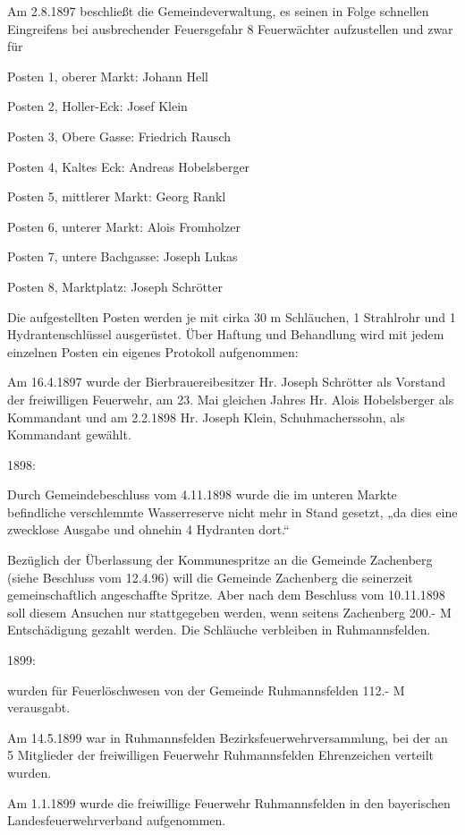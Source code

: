 Am 2.8.1897 beschließt die Gemeindeverwaltung, es seinen in Folge schnellen
Eingreifens bei ausbrechender Feuersgefahr 8 Feuerwächter aufzustellen und zwar
für



Posten 1, oberer Markt: Johann Hell

Posten 2, Holler-Eck: Josef Klein

Posten 3, Obere Gasse: Friedrich Rausch

Posten 4, Kaltes Eck: Andreas Hobelsberger

Posten 5, mittlerer Markt: Georg Rankl

Posten 6, unterer Markt: Alois Fromholzer

Posten 7, untere Bachgasse: Joseph Lukas

Posten 8, Marktplatz: Joseph Schrötter



Die aufgestellten Posten werden je mit cirka 30 m Schläuchen, 1 Strahlrohr und 1
Hydrantenschlüssel ausgerüstet. Über Haftung und Behandlung wird mit jedem
einzelnen Posten ein eigenes Protokoll aufgenommen:

Am 16.4.1897 wurde der Bierbrauereibesitzer Hr. Joseph Schrötter als Vorstand
der freiwilligen Feuerwehr, am 23. Mai gleichen Jahres Hr. Alois Hobelsberger
als Kommandant und am 2.2.1898 Hr. Joseph Klein, Schuhmacherssohn, als
Kommandant gewählt.

1898:

Durch Gemeindebeschluss vom 4.11.1898 wurde die im unteren Markte befindliche
verschlemmte Wasserreserve nicht mehr in Stand gesetzt, „da dies eine zwecklose
Ausgabe und ohnehin 4 Hydranten dort.“

Bezüglich der Überlassung der Kommunespritze an die Gemeinde Zachenberg (siehe
Beschluss vom 12.4.96) will die Gemeinde Zachenberg die seinerzeit
gemeinschaftlich angeschaffte Spritze. Aber nach dem Beschluss vom 10.11.1898
soll diesem Ansuchen nur stattgegeben werden, wenn seitens Zachenberg 200.- M
Entschädigung gezahlt werden. Die Schläuche verbleiben in Ruhmannsfelden.

1899:

wurden für Feuerlöschwesen von der Gemeinde Ruhmannsfelden 112.- M verausgabt.

Am 14.5.1899 war in Ruhmannsfelden Bezirksfeuerwehrversammlung, bei der an 5
Mitglieder der freiwilligen Feuerwehr Ruhmannsfelden Ehrenzeichen verteilt
wurden.

Am 1.1.1899 wurde die freiwillige Feuerwehr Ruhmannsfelden in den bayerischen
Landesfeuerwehrverband aufgenommen.


